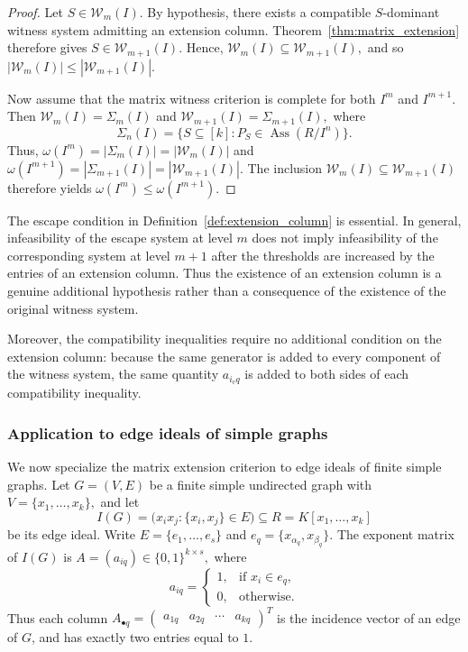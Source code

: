 \documentclass[11pt]{amsart}   %
\begin{document}
\begin{proof}
Let $S\in\mathcal W_m(I).$ By hypothesis, there exists a compatible $S$-dominant witness system
admitting an extension column.  Theorem~\ref{thm:matrix_extension}
therefore gives $S\in\mathcal W_{m+1}(I).$ Hence, $\mathcal W_m(I)\subseteq\mathcal W_{m+1}(I),$
and so $|\mathcal W_m(I)|\leq|\mathcal W_{m+1}(I)|.$

Now assume that the matrix witness criterion is complete for both
$I^m$ and $I^{m+1}$.  Then  $\mathcal W_m(I)=\Sigma_m(I)$ and $\mathcal W_{m+1}(I)=\Sigma_{m+1}(I),$
 where $$\Sigma_n(I)=\{S\subseteq[k]:P_S\in\operatorname{Ass}(R/I^n)\}.$$
Thus,   $\omega(I^m)=|\Sigma_m(I)| =|\mathcal W_m(I)|$ and
 $\omega(I^{m+1})=|\Sigma_{m+1}(I)|=|\mathcal W_{m+1}(I)|.$ The inclusion
 $\mathcal W_m(I)\subseteq\mathcal W_{m+1}(I)$ therefore yields $\omega(I^m) \leq \omega(I^{m+1}).$
\end{proof}


\begin{rem}\label{rem:extension_column}
The escape condition in Definition~\ref{def:extension_column} is
essential.  In general, infeasibility of the escape system at level
$m$ does not imply infeasibility of the corresponding system at level
$m+1$ after the thresholds are increased by the entries of an
extension column.  Thus the existence of an extension column is a
genuine additional hypothesis rather than a consequence of the
existence of the original witness system.

Moreover, the compatibility inequalities require no additional
condition on the extension column: because the same generator is added
to every component of the witness system, the same quantity
$a_{i_vq}$ is added to both sides of each compatibility inequality.
\end{rem}

\subsubsection{Application to edge ideals of simple graphs} \label{sec:edge_ideal_extension}
We now specialize the matrix extension criterion to edge ideals of
finite simple graphs. Let $G=(V,E)$ be a finite simple undirected graph with
 $V=\{x_1,\ldots,x_k\},$ and let
\[
I(G)=\bigl(x_ix_j:\{x_i,x_j\}\in E\bigr)
\subseteq R=K[x_1,\ldots,x_k]
\]
be its edge ideal. Write $E=\{e_1,\ldots,e_s\}$ and $e_q=\{x_{\alpha_q},x_{\beta_q}\}.$
The exponent matrix of \(I(G)\) is $A=(a_{iq})\in\{0,1\}^{k\times s},$
where
\[
a_{iq}
=
\begin{cases}
1,&\text{if }x_i\in e_q,\\
0,&\text{otherwise}.
\end{cases}
\]
Thus each column $A_{\bullet q}=\begin{pmatrix}a_{1q} & a_{2q} & \cdots & a_{kq}\end{pmatrix}^{T}$
 is the incidence vector of an edge
of \(G\), and has exactly two entries equal to \(1\).
\end{document}
